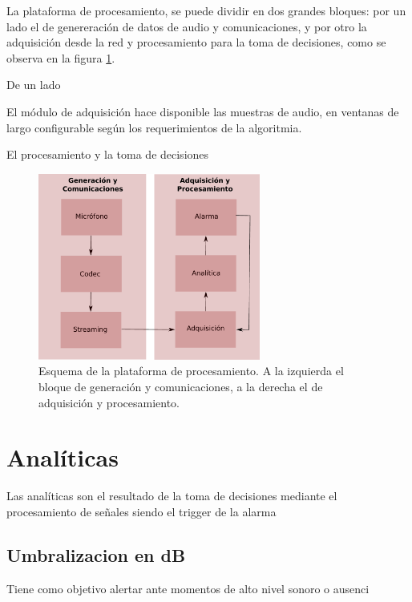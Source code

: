 \documentclass{article}
\begin{document}
La plataforma de procesamiento, se puede dividir en dos grandes bloques: por un lado el de genereración de datos de audio y comunicaciones, y por otro la adquisición desde la red y procesamiento para la toma de decisiones, como se observa en la figura \ref{fig:plataforma_procesamiento}.

De un lado 

El módulo de adquisición hace disponible las muestras de audio, en ventanas de largo configurable según los requerimientos de la algoritmia.

El procesamiento y la toma de decisiones 

\begin{figure}[h]
\begin{center}
\includegraphics[width=0.65\textwidth]{plataforma_procesamiento} 
\caption{Esquema de la plataforma de procesamiento. A la izquierda el bloque de generación y comunicaciones, a la derecha el de adquisición y procesamiento.}
\label{fig:plataforma_procesamiento}
\end{center}
\end{figure}


\section{Analíticas}
Las analíticas son el resultado de la toma de decisiones mediante el procesamiento de señales siendo el trigger de la alarma

\subsection{Umbralizacion en dB}
Tiene como objetivo alertar ante momentos de alto nivel sonoro o ausenci
\end{document}
